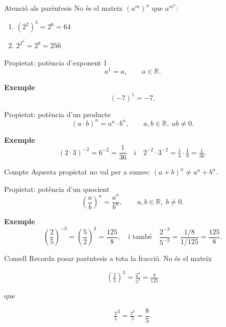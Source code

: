 \begin{nota}{Atenció als parèntesis}
No és el mateix $\left(a^m\right)^n$ que $a^{m^n}$:

\begin{enumerate}
\item $\left(2^2\right)^3 = 2^6 = 64$
\item $2^{2^3}=2^{8}=256$
\end{enumerate}
\end{nota}

\begin{propietat}{Propietat: potència d'exponent 1}
\[
a^1 = a, \qquad a \in \mathbb{R}.
\]
\end{propietat}

\begin{exemple}{\textbf{Exemple}}
\[
(-7)^1 = -7.
\]
\end{exemple}

\begin{propietat}{Propietat: potència d'un producte}
\[
(a \cdot b)^n = a^n \cdot b^n, \qquad a,b \in \mathbb{R},\; ab\neq 0.
\]
\end{propietat}

\begin{exemple}{\textbf{Exemple}}
\[
(2\cdot 3)^{-2} = 6^{-2} = \frac{1}{36}
\quad\text{i}\quad
2^{-2}\cdot 3^{-2} = \tfrac{1}{4}\cdot \tfrac{1}{9}=\tfrac{1}{36}.
\]
\end{exemple}

\begin{nota}{Compte}
Aquesta propietat no val per a sumes: $(a+b)^n \neq a^n+b^n$.
\end{nota}

\begin{propietat}{Propietat: potència d'un quocient}
\[
\left(\frac{a}{b}\right)^n = \frac{a^n}{b^n}, \qquad a,b \in \mathbb{R},\; b\neq 0.
\]
\end{propietat}

\begin{exemple}{\textbf{Exemple}}
\[
\left(\frac{2}{5}\right)^{-3} = \left(\frac{5}{2}\right)^3=\frac{125}{8},
\quad\text{i també}\quad \frac{2^{-3}}{5^{-3}}=\frac{1/8}{1/125}=\frac{125}{8}.
\]
\end{exemple}

\begin{nota}{Consell}
Recorda posar parèntesis a tota la fracció. No és el mateix

\[
\left(\tfrac{2}{5}\right)^3 = \tfrac{2^3}{5^3} = \tfrac{8}{125}
\]

que

\[
{\tfrac{2}{5}}^3 = \tfrac{2^3}{5}= \frac{8}{5}.
\]
\end{nota}

